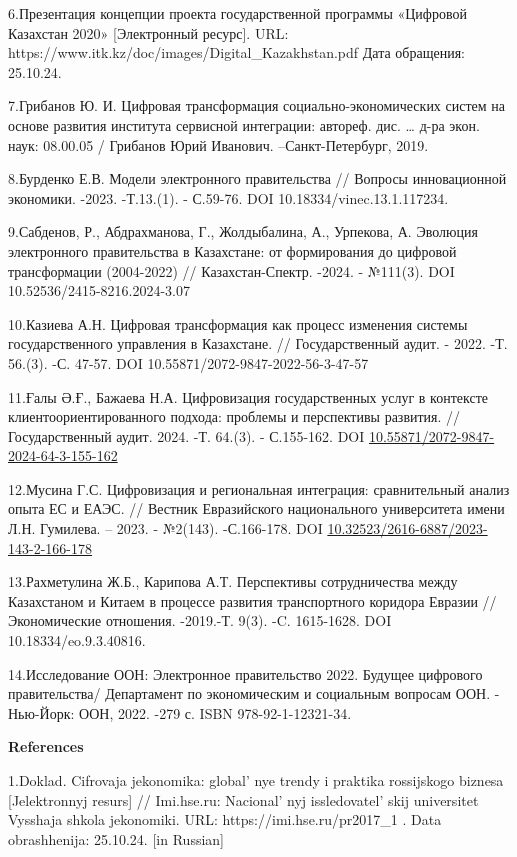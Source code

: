 {6.Презентация концепции проекта государственной программы «Цифровой
Казахстан 2020» {[}Электронный ресурс{]}. URL:
https://www.itk.kz/doc/images/Digital\_Kazakhstan.pdf Дата обращения:
25.10.24.

7.Грибанов Ю. И. Цифровая трансформация социально-экономических систем
на основе развития института сервисной интеграции: автореф. дис.
\ldots{} д-ра экон. наук: 08.00.05 / Грибанов Юрий Иванович.
--Санкт-Петербург, 2019.

8.Бурденко Е.В. Модели электронного правительства // Вопросы
инновационной экономики. -2023. -Т.13.(1). - С.59-76. DOI
10.18334/vinec.13.1.117234.

9.Сабденов, Р., Абдрахманова, Г., Жолдыбалина, А., Урпекова, А. Эволюция
электронного правительства в Казахстане: от формирования до цифровой
трансформации (2004-2022) // Казахстан-Спектр. -2024. - №111(3). DOI
10.52536/2415-8216.2024-3.07

10.Казиева А.Н. Цифровая трансформация как процесс изменения системы
государственного управления в Казахстане. // Государственный аудит. -
2022. -Т. 56.(3). -С. 47-57. DOI 10.55871/2072-9847-2022-56-3-47-57

11.Ғалы Ә.Ғ., Бажаева Н.А. Цифровизация государственных услуг в
контексте клиентоориентированного подхода: проблемы и перспективы
развития. // Государственный аудит. 2024. -Т. 64.(3). - С.155-162. DOI
\href{https://doi.org/10.55871/2072-9847-2024-64-3-155-162}{10.55871/2072-9847-2024-64-3-155-162}

12.Мусина Г.С. Цифровизация и региональная интеграция: сравнительный
анализ опыта ЕС и ЕАЭС. // Вестник Евразийского национального
университета имени Л.Н. Гумилева. -- 2023. - №2(143). -С.166-178. DOI
\href{https://doi.org/10.32523/2616-6887/2023-143-2-166-178}{10.32523/2616-6887/2023-143-2-166-178}

13.Рахметулина Ж.Б., Карипова А.Т. Перспективы сотрудничества между
Казахстаном и Китаем в процессе развития транспортного коридора Евразии
// Экономические отношения. -2019.-Т. 9(3). -C. 1615-1628. DOI
10.18334/eo.9.3.40816.

14.Исследование ООН: Электронное правительство 2022. Будущее цифрового
правительства/ Департамент по экономическим и социальным вопросам ООН. -
Нью-Йорк: ООН, 2022. -279 с. ISBN 978-92-1-12321-34.

{\bfseries References}

1.Doklad. Cifrovaja jekonomika: global' nye trendy i
praktika rossijskogo biznesa {[}Jelektronnyj resurs{]} // Imi.hse.ru:
Nacional' nyj issledovatel' skij
universitet Vysshaja shkola jekonomiki. URL:
https://imi.hse.ru/pr2017\_1 . Data obrashhenija: 25.10.24. {[}in
Russian{]}

}
